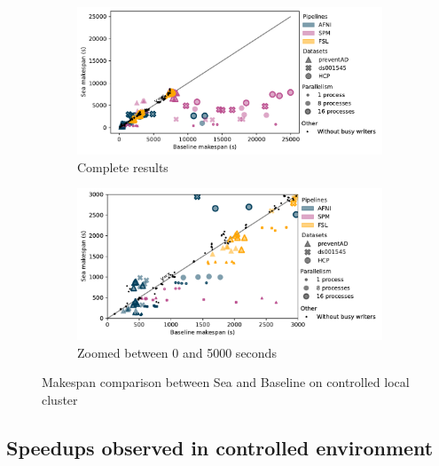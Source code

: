 \begin{figure}

\begin{subfigure}{\textwidth}
    \centering
    \captionsetup{width=.85\linewidth}
    \includegraphics[width=\columnwidth]{figures/sea-neuro/slashbin_nozoom.pdf}%
    \caption{Complete results}\label{fig:seaneuro:slashbinfull}
\end{subfigure}
\begin{subfigure}{\textwidth}
    \centering
    \captionsetup{width=.85\linewidth}
    \includegraphics[width=\linewidth]{figures/sea-neuro/slashbin_withzoom.pdf}
    \caption{Zoomed between 0 and 5000 seconds}\label{fig:seaneuro:slashbinzoom}
\end{subfigure}
\caption{Makespan comparison between Sea and Baseline on controlled local cluster}
\label{fig:seaneuro:slashbin}
\end{figure}

\subsection{Speedups observed in controlled environment}


